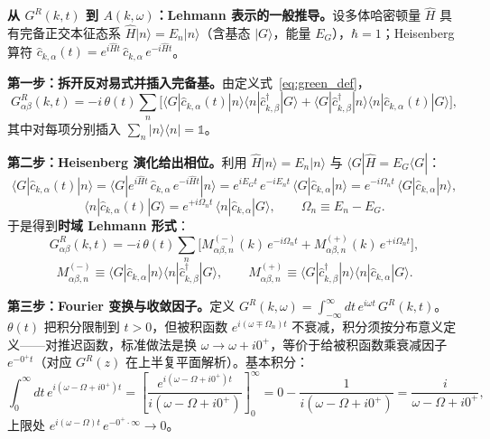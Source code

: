\documentclass[onecolumn,aps,prl,superscriptaddress,longbibliography]{revtex4-2}
\begin{document}
\textbf{从 $G^R(k,t)$ 到 $A(k,\omega)$：Lehmann 表示的一般推导。}设多体哈密顿量 $\hat{H}$ 具有完备正交本征态系 $\hat{H}|n\rangle = E_n|n\rangle$（含基态 $|G\rangle$，能量 $E_G$），$\hbar = 1$；Heisenberg 算符 $\hat{c}_{k,\alpha}(t) = e^{i\hat{H}t}\,\hat{c}_{k,\alpha}\,e^{-i\hat{H}t}$。

\textbf{第一步：拆开反对易式并插入完备基。}由定义式~\eqref{eq:green_def}，
\begin{equation}
G^R_{\alpha\beta}(k,t) = -i\,\theta(t)\sum_n\Big[\langle G|\hat{c}_{k,\alpha}(t)|n\rangle\langle n|\hat{c}^\dagger_{k,\beta}|G\rangle + \langle G|\hat{c}^\dagger_{k,\beta}|n\rangle\langle n|\hat{c}_{k,\alpha}(t)|G\rangle\Big],
\end{equation}
其中对每项分别插入 $\sum_n|n\rangle\langle n| = \mathbb{1}$。

\textbf{第二步：Heisenberg 演化给出相位。}利用 $\hat{H}|n\rangle = E_n|n\rangle$ 与 $\langle G|\hat{H} = E_G\langle G|$：
\begin{equation}
\langle G|\hat{c}_{k,\alpha}(t)|n\rangle = \langle G|e^{i\hat{H}t}\,\hat{c}_{k,\alpha}\,e^{-i\hat{H}t}|n\rangle = e^{iE_G t}\,e^{-iE_n t}\,\langle G|\hat{c}_{k,\alpha}|n\rangle = e^{-i\Omega_n t}\,\langle G|\hat{c}_{k,\alpha}|n\rangle,
\end{equation}
\begin{equation}
\langle n|\hat{c}_{k,\alpha}(t)|G\rangle = e^{+i\Omega_n t}\,\langle n|\hat{c}_{k,\alpha}|G\rangle,\qquad \Omega_n \equiv E_n - E_G.
\end{equation}
于是得到\textbf{时域 Lehmann 形式}：
\begin{equation}\label{eq:time_lehmann}
G^R_{\alpha\beta}(k,t) = -i\,\theta(t)\sum_n\Big[M^{(-)}_{\alpha\beta,n}(k)\,e^{-i\Omega_n t} + M^{(+)}_{\alpha\beta,n}(k)\,e^{+i\Omega_n t}\Big],
\end{equation}
\begin{equation}
M^{(-)}_{\alpha\beta,n} \equiv \langle G|\hat{c}_{k,\alpha}|n\rangle\langle n|\hat{c}^\dagger_{k,\beta}|G\rangle,\qquad
M^{(+)}_{\alpha\beta,n} \equiv \langle G|\hat{c}^\dagger_{k,\beta}|n\rangle\langle n|\hat{c}_{k,\alpha}|G\rangle.
\end{equation}

\textbf{第三步：Fourier 变换与收敛因子。}定义 $G^R(k,\omega) = \int_{-\infty}^{\infty}dt\,e^{i\omega t}\,G^R(k,t)$。$\theta(t)$ 把积分限制到 $t > 0$，但被积函数 $e^{i(\omega\mp\Omega_n)t}$ 不衰减，积分须按分布意义定义——对推迟函数，标准做法是换 $\omega \to \omega + i0^+$，等价于给被积函数乘衰减因子 $e^{-0^+ t}$（对应 $G^R(z)$ 在上半复平面解析）。基本积分：
\begin{equation}\label{eq:fourier_integral}
\int_0^{\infty}dt\,e^{i(\omega - \Omega + i0^+)t} = \left[\frac{e^{i(\omega-\Omega+i0^+)t}}{i(\omega-\Omega+i0^+)}\right]_0^{\infty} = 0 - \frac{1}{i(\omega-\Omega+i0^+)} = \frac{i}{\omega-\Omega+i0^+},
\end{equation}
上限处 $e^{i(\omega-\Omega)t}\,e^{-0^+\cdot\infty} \to 0$。
\end{document}
